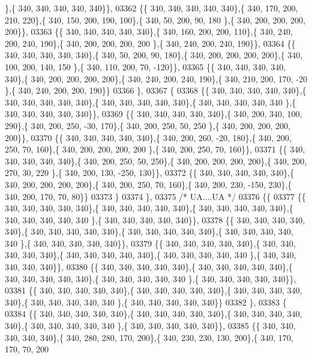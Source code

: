 \begin{DoxyCode}
      \},\{ 340, 340, 340, 340, 340\}\},
03362 \{\{ 340, 340, 340, 340, 340\},\{ 340, 170, 200, 210, 220\},\{ 340, 150, 200, 190, 100\},\{ 340,  50, 200,  90, 180
      \},\{ 340, 200, 200, 200, 200\}\},
03363 \{\{ 340, 340, 340, 340, 340\},\{ 340, 160, 200, 200, 110\},\{ 340, 240, 200, 240, 190\},\{ 340, 200, 200, 200, 200
      \},\{ 340, 240, 200, 240, 190\}\},
03364 \{\{ 340, 340, 340, 340, 340\},\{ 340,  50, 200,  90, 180\},\{ 340, 200, 200, 200, 200\},\{ 340, 100, 200, 140, 150
      \},\{ 340, 110, 200,  70, -120\}\},
03365 \{\{ 340, 340, 340, 340, 340\},\{ 340, 200, 200, 200, 200\},\{ 340, 240, 200, 240, 190\},\{ 340, 210, 200, 170, -20
      \},\{ 340, 240, 200, 200, 190\}\}
03366 \},
03367 \{
03368 \{\{ 340, 340, 340, 340, 340\},\{ 340, 340, 340, 340, 340\},\{ 340, 340, 340, 340, 340\},\{ 340, 340, 340, 340, 340
      \},\{ 340, 340, 340, 340, 340\}\},
03369 \{\{ 340, 340, 340, 340, 340\},\{ 340, 200, 340, 100, 290\},\{ 340, 200, 250, -30, 170\},\{ 340, 200, 250,  50, 250
      \},\{ 340, 200, 200, 200, 200\}\},
03370 \{\{ 340, 340, 340, 340, 340\},\{ 340, 200, 260, -20, 180\},\{ 340, 200, 250,  70, 160\},\{ 340, 200, 200, 200, 200
      \},\{ 340, 200, 250,  70, 160\}\},
03371 \{\{ 340, 340, 340, 340, 340\},\{ 340, 200, 250,  50, 250\},\{ 340, 200, 200, 200, 200\},\{ 340, 200, 270,  30, 220
      \},\{ 340, 200, 130, -250, 130\}\},
03372 \{\{ 340, 340, 340, 340, 340\},\{ 340, 200, 200, 200, 200\},\{ 340, 200, 250,  70, 160\},\{ 340, 200, 230, -150, 
      230\},\{ 340, 200, 170,  70,  80\}\}
03373 \}
03374 \},
03375 \textcolor{comment}{/* UA....UA */}
03376 \{\{
03377 \{\{ 340, 340, 340, 340, 340\},\{ 340, 340, 340, 340, 340\},\{ 340, 340, 340, 340, 340\},\{ 340, 340, 340, 340, 340
      \},\{ 340, 340, 340, 340, 340\}\},
03378 \{\{ 340, 340, 340, 340, 340\},\{ 340, 340, 340, 340, 340\},\{ 340, 340, 340, 340, 340\},\{ 340, 340, 340, 340, 340
      \},\{ 340, 340, 340, 340, 340\}\},
03379 \{\{ 340, 340, 340, 340, 340\},\{ 340, 340, 340, 340, 340\},\{ 340, 340, 340, 340, 340\},\{ 340, 340, 340, 340, 340
      \},\{ 340, 340, 340, 340, 340\}\},
03380 \{\{ 340, 340, 340, 340, 340\},\{ 340, 340, 340, 340, 340\},\{ 340, 340, 340, 340, 340\},\{ 340, 340, 340, 340, 340
      \},\{ 340, 340, 340, 340, 340\}\},
03381 \{\{ 340, 340, 340, 340, 340\},\{ 340, 340, 340, 340, 340\},\{ 340, 340, 340, 340, 340\},\{ 340, 340, 340, 340, 340
      \},\{ 340, 340, 340, 340, 340\}\}
03382 \},
03383 \{
03384 \{\{ 340, 340, 340, 340, 340\},\{ 340, 340, 340, 340, 340\},\{ 340, 340, 340, 340, 340\},\{ 340, 340, 340, 340, 340
      \},\{ 340, 340, 340, 340, 340\}\},
03385 \{\{ 340, 340, 340, 340, 340\},\{ 340, 280, 280, 170, 200\},\{ 340, 230, 230, 130, 200\},\{ 340, 170, 170,  70, 200

\end{DoxyCode}
